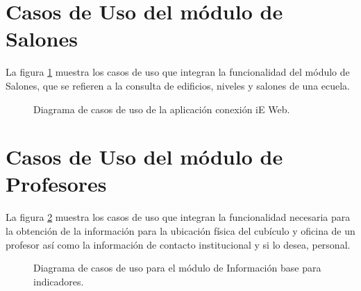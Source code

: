 \section{Casos de Uso del módulo de Salones}

    La figura \ref{fig:casosUso:web} muestra los casos de uso que integran la funcionalidad del módulo de Salones, que se refieren a la consulta de edificios, niveles y salones de una ecuela.

    \begin{figure}[h!]
	\begin{center}
	\caption{Diagrama de casos de uso de la aplicación conexión iE Web. \label{fig:casosUso:web}}
	\end{center}
    \end{figure}

\section{Casos de Uso del módulo de Profesores}
La figura \ref{fig:casosUso:movil} muestra los casos de uso que integran la funcionalidad necesaria para la obtención de la información para la ubicación física del cubículo y oficina de un profesor así como la información de contacto institucional y si lo desea, personal.

 \begin{figure}[h!]
     \begin{center}
     \caption{Diagrama de casos de uso para el módulo de Información base para indicadores.}
     \label{fig:casosUso:movil}
     \end{center}
 \end{figure}

